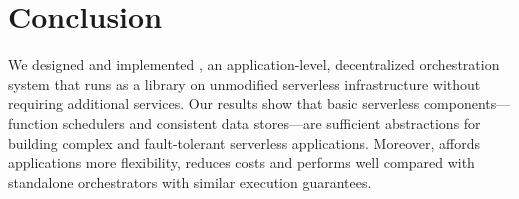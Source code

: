 \section{Conclusion}\label{sec:conclusion}


We designed and implemented \name {}, an application-level, decentralized
orchestration system that runs as a library on unmodified serverless
infrastructure without requiring additional services. Our results show that
basic serverless components---function schedulers and consistent data
stores---are sufficient abstractions for building complex and fault-tolerant
serverless applications. Moreover, \name{} affords applications more
flexibility, reduces costs and performs well compared with standalone
orchestrators with similar execution guarantees.